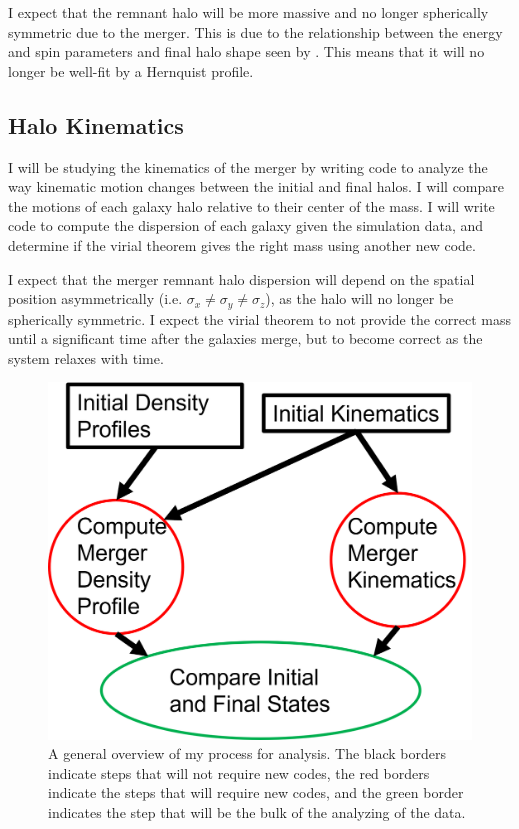 \documentclass[linenumbers]{aastex631}
\begin{document}
I expect that the remnant halo will be more massive and no longer spherically symmetric due to the merger. This is due to the relationship between the energy and spin parameters and final halo shape seen by \cite{DrakosB}. This means that it will no longer be well-fit by a Hernquist profile.

\subsection{Halo Kinematics}
I will be studying the kinematics of the merger by writing code to analyze the way kinematic motion changes between the initial and final halos. I will compare the motions of each galaxy halo relative to their center of the mass. I will write code to compute the dispersion of each galaxy given the simulation data, and determine if the virial theorem gives the right mass using another new code.

I expect that the merger remnant halo dispersion will depend on the spatial position asymmetrically (i.e. $\sigma_x \neq \sigma_y \neq \sigma_z$), as the halo will no longer be spherically symmetric. I expect the virial theorem to not provide the correct mass until a significant time after the galaxies merge, but to become correct as the system relaxes with time.

\begin{figure}[h]
    \centering
    \includegraphics{MethodsFlowchart400B.png}
    \caption{A general overview of my process for analysis. The black borders indicate steps that will not require new codes, the red borders indicate the steps that will require new codes, and the green border indicates the step that will be the bulk of the analyzing of the data.}
    \label{fig:2}
\end{figure}


\end{document}
